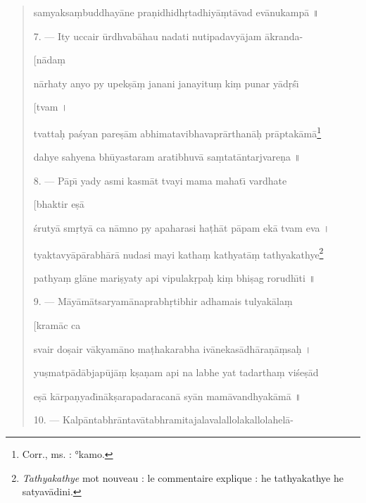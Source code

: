 \documentclass[a4paper, 11pt, oneside, french]{article}
\begin{document}
\begin{quotation}
samyaksa\d{m}buddhay\={a}ne pra\d{n}idhidh\d{r}tadhiy\={a}\d{m}t\={a}vad ev\={a}nukamp\={a} \texthindi{॥}

\bigskip

7. --- Ity uccair \={u}rdhvab\={a}hau nadati nutipadavy\={a}jam \={a}kranda-

\hspace*{25mm}[n\={a}da\d{m}

n\={a}rhaty anyo py upek\d{s}\={a}\d{m} janani janayitu\d{m} ki\d{m} punar y\={a}d\d{r}\'{s}\={\i}

\hspace*{25mm}[tvam \texthindi{।}

tvatta\d{h} pa\'{s}yan pare\d{s}\={a}m abhimatavibhavapr\={a}rthan\={a}\d{h} pr\={a}ptak\={a}m\={a}\footnote{Corr., ms. : °kamo.}

dahye sahyena bh\={u}yastaram aratibhuv\={a} sa\d{m}tat\={a}ntarjvare\d{n}a \texthindi{॥}

\bigskip

8. --- P\={a}p\={\i} yady asmi kasm\={a}t tvayi mama mahat\={\i} vardhate

\hspace*{25mm}[bhaktir e\d{s}\={a}

\'{s}ruty\={a} sm\d{r}ty\={a} ca n\={a}mno py apaharasi ha\d{t}h\={a}t p\={a}pam ek\={a} tvam eva \texthindi{।}

tyaktavy\={a}p\={a}rabh\={a}r\={a} nudasi mayi katha\d{m} kathyat\={a}\d{m} tathyakathye\footnote{\emph{Tathyakathye} mot nouveau : le commentaire explique : he tathyakathye he satyav\={a}dini.}

pathya\d{m} gl\={a}ne mari\d{s}yaty api vipulak\d{r}pa\d{h} ki\d{m} bhi\d{s}ag rorudh\={\i}ti \texthindi{॥}

\bigskip

9. --- M\={a}y\={a}m\={a}tsaryam\={a}naprabh\d{r}tibhir adhamais tulyak\={a}la\d{m}

\hspace*{25mm}[kram\={a}c ca

svair do\d{s}air v\={a}kyam\={a}no ma\d{t}hakarabha iv\={a}nekas\={a}dh\={a}ra\d{n}\={a}\d{m}sa\d{h} \texthindi{।}

yu\d{s}matp\={a}d\={a}bjap\={u}j\={a}\d{m} k\d{s}a\d{n}am api na labhe yat tadartha\d{m} vi\'{s}e\d{s}\={a}d

e\d{s}\={a} k\={a}rpa\d{n}yad\={\i}n\={a}k\d{s}arapadaracan\={a} sy\={a}n mam\={a}vandhyak\={a}m\={a} \texthindi{॥}

\bigskip

10. --- Kalp\={a}ntabhr\={a}ntav\={a}tabhramitajalavalallolakallolahel\={a}-


\end{quotation}
\end{document}
